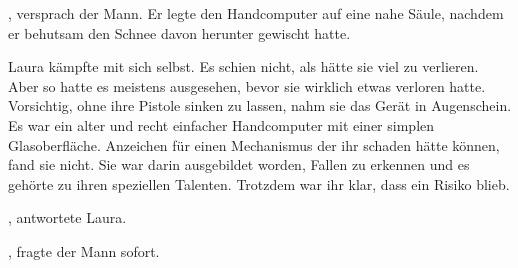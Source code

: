 , versprach der Mann.  Er legte den Handcomputer auf eine nahe Säule, nachdem er behutsam den Schnee davon herunter gewischt hatte. 

\par

Laura kämpfte mit sich selbst. Es schien nicht, als hätte sie viel zu verlieren. Aber so hatte es meistens ausgesehen, bevor sie wirklich etwas verloren hatte. Vorsichtig, ohne ihre Pistole sinken zu lassen, nahm sie das Gerät in Augenschein. Es war ein alter und recht einfacher Handcomputer mit einer simplen Glasoberfläche. Anzeichen für einen Mechanismus der ihr schaden hätte können, fand sie nicht. Sie war darin ausgebildet worden, Fallen zu erkennen und es gehörte zu ihren speziellen Talenten. Trotzdem war ihr klar, dass ein Risiko blieb.

\par

, antwortete Laura. 

\par

, fragte der Mann sofort.

\par


\par


\par


\par


\par


\par

